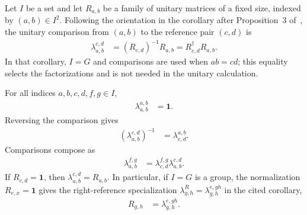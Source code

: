 \begin{definition}
    \label{def:mpug_unitary_factorization_comparison}
    \leanok
    Let $I$ be a set and let $R_{a,b}$ be a family of unitary matrices of a
    fixed size, indexed by $(a,b)\in I^2$. Following the orientation in the
    corollary after Proposition~3
    of~\cite[lines~2782--2821]{FrancoRubio2025MPUGauging}, the unitary
    comparison from $(a,b)$ to the reference pair $(c,d)$ is
    \begin{align}
        \lambda_{a,b}^{c,d}
         & =(R_{c,d})^{-1}R_{a,b}
        =R_{c,d}^\dagger R_{a,b}.
        \label{eq:mpug_unitary_factorization_comparison}
    \end{align}
    In that corollary, $I=G$ and comparisons are used when $ab=cd$; this
    equality selects the factorizations and is not needed in the unitary
    calculation.
\end{definition}

\begin{lemma}
    \label{thm:mpug_unitary_factorization_comparison_laws}
    \leanok
    For all indices $a,b,c,d,f,g\in I$,
    \begin{align}
        \lambda_{a,b}^{a,b} & =\mathbf 1.
    \end{align}
    Reversing the comparison gives
    \begin{align}
        \left(\lambda_{a,b}^{c,d}\right)^{-1}
         & =\lambda_{c,d}^{a,b}.
    \end{align}
    Comparisons compose as
    \begin{align}
        \lambda_{a,b}^{f,g}
         & =\lambda_{c,d}^{f,g}\lambda_{a,b}^{c,d}.
        \label{eq:mpug_unitary_factorization_comparison_laws}
    \end{align}
    If $R_{c,d}=\mathbf 1$, then
    $\lambda_{a,b}^{c,d}=R_{a,b}$. In particular, if $I=G$ is a group, the
    normalization $R_{e,x}=\mathbf 1$ gives the right-reference specialization
    $\lambda^R_{g,h}=\lambda_{g,h}^{e,gh}$ in the cited corollary,
    \begin{align}
        R_{g,h} & =\lambda_{g,h}^{e,gh}.
        \label{eq:mpug_unitary_factorization_right_reference}
    \end{align}
\end{lemma}

